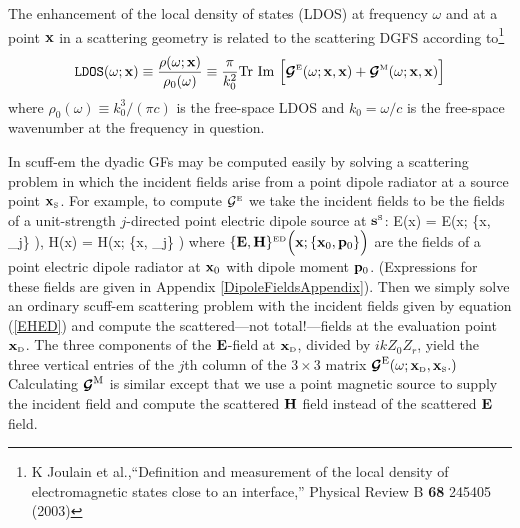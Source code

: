 \documentclass[letterpaper]{article}
\begin{document}
The enhancement of the local density of states (LDOS)
at frequency $\omega$ and at a point $\mathbf{x}$ in a 
scattering geometry is related to the scattering DGFS according 
to\footnote{K Joulain et al.,``Definition and measurement of the local 
density of electromagnetic states close to an interface,''
Physical Review B \textbf{68} 245405 (2003)}
$$
   \texttt{LDOS}(\omega; \mathbf{x})
   \equiv 
   \frac{\rho(\omega; \mathbf{x})}{\rho_0(\omega)}
   \equiv 
   \frac{\pi}{k_0^2}\text{Tr }\text{Im }
   \Big[ \boldsymbol{\mathcal{G}}^{\hbox{\tiny{E}}}(\omega; \mathbf{x}, \mathbf{x})
        +\boldsymbol{\mathcal{G}}^{\hbox{\tiny{M}}}(\omega; \mathbf{x}, \mathbf{x})
   \Big]
$$
where $\rho_0(\omega)\equiv k^3_0/(\pi c)$ is the free-space
LDOS and $k_0=\omega/c$ is the free-space wavenumber at the
frequency in question.

In {\sc scuff-em} the dyadic GFs may be computed easily by solving a
scattering problem in which the incident fields arise from a point dipole
radiator at a source point $\mathbf{x}_{\hbox{\tiny{S}}}$.
For example, to compute $\mathcal{G}^{\hbox{\tiny{E}}}$ we take the incident fields 
to be the fields of a unit-strength $j$-directed point electric dipole 
source at $\mathbf{s}^{\hbox{\tiny{S}}}$:
{
 \vb E(\vb x) =
 \vb E\Big(\vb x; \{\vb x, _j\} \Big),
 \qquad
 \vb H(\vb x) =
 \vb H\Big(\vb x; \{\vb x, _j\} \Big)
}
where $\{\mathbf{E}, \mathbf{H}\}^{\hbox{\tiny{ED}}}\Big(\mathbf{x}; \{\mathbf{x}_0, \mathbf{p}_0\}\Big)$
are the fields of a point electric dipole radiator 
at $\mathbf{x}_0$ with dipole moment $\mathbf{p}_0$. 
(Expressions for these fields are given in 
Appendix \ref{DipoleFieldsAppendix}).
Then we simply solve an ordinary {\sc scuff-em} scattering
problem with the incident fields given by equation 
(\ref{EHED}) and compute the scattered---not total!---fields
at the evaluation point $\mathbf{x}_{\hbox{\tiny{D}}}$. The three components of the
$\mathbf{E}$-field at $\mathbf{x}_{\hbox{\tiny{D}}}$, divided by $ikZ_0 Z_r$, yield the
three vertical entries of the $j$th column of the
$3\times 3$ matrix 
$\boldsymbol{\mathcal{G}}^{\hbox{\scriptsize{E}}}(\omega; \mathbf{x}_{\hbox{\tiny{D}}}, \mathbf{x}_{\hbox{\tiny{S}}}.)$
Calculating $\boldsymbol{\mathcal{G}}^{\hbox{\scriptsize{M}}}$ is similar except that we use 
a point magnetic source to supply the incident field 
and compute the scattered $\mathbf{H}$ field instead of the 
scattered $\mathbf{E}$ field.

\newpage
\end{document}
